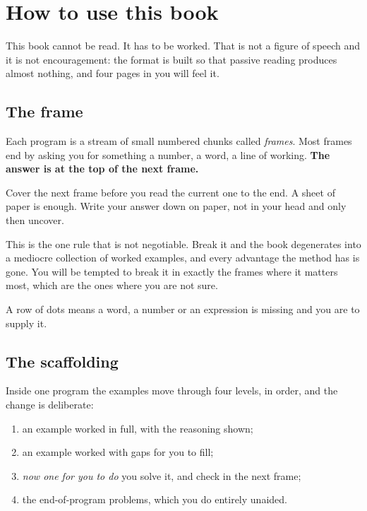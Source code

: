 \chapter*{How to use this book}
{}

\noindent
This book cannot be read. It has to be worked. That is not a figure of speech
and it is not encouragement: the format is built so that passive reading
produces almost nothing, and four pages in you will feel it.

\section*{The frame}

Each program is a stream of small numbered chunks called \emph{frames}. Most
frames end by asking you for something \dash{} a number, a word, a line of
working. \textbf{The answer is at the top of the next frame.}

\begin{warning}
Cover the next frame before you read the current one to the end. A sheet of
paper is enough. Write your answer down \dash{} on paper, not in your head \dash{}
and only then uncover.

This is the one rule that is not negotiable. Break it and the book degenerates
into a mediocre collection of worked examples, and every advantage the method
has is gone. You will be tempted to break it in exactly the frames where it
matters most, which are the ones where you are not sure.
\end{warning}

\noindent
A row of dots \blank{} means a word, a number or an expression is missing and
you are to supply it.

\section*{The scaffolding}

Inside one program the examples move through four levels, in order, and the
change is deliberate:

\begin{enumerate}[leftmargin=1.6em, itemsep=3pt]
  \item an example worked in full, with the reasoning shown;
  \item an example worked with gaps for you to fill;
  \item \emph{now one for you to do} \dash{} you solve it, and check in the next
        frame;
  \item the end-of-program problems, which you do entirely unaided.
\end{enumerate}


